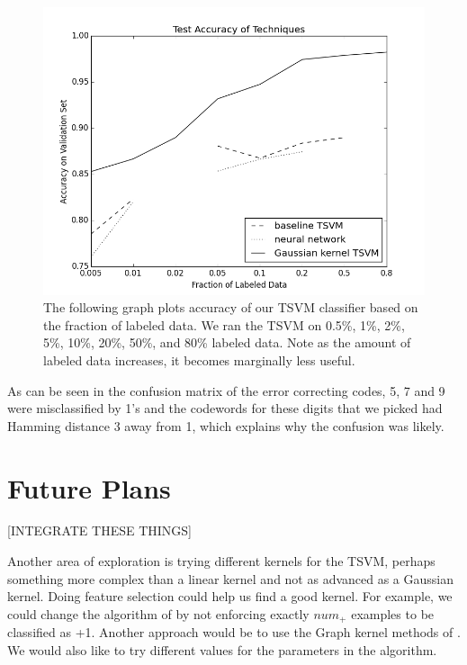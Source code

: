 \documentclass[11pt]{article}
\begin{document}
\begin{figure}
  \centering
  \caption{The following graph plots accuracy of our TSVM classifier based on the fraction of labeled data. We ran the TSVM on 0.5\%, 1\%, 2\%, 5\%, 10\%, 20\%, 50\%, and 80\% labeled data. Note as the amount of labeled data increases, it becomes marginally less useful.}
  \includegraphics[width=5in]{figure_1.png}
\end{figure}


As can be seen in the confusion matrix of the error correcting codes,
5, 7 and 9 were misclassified by 1's and the codewords for
these digits that we picked had Hamming distance 3 away from 1, which
explains why the confusion was likely.

\section{Future Plans}

[INTEGRATE THESE THINGS]

Another area of exploration is trying different kernels for the TSVM, perhaps something more complex than a linear kernel and not as advanced as a Gaussian kernel. Doing feature selection could help us find a good kernel. For example, we could change the algorithm of \cite{Joachims:1999} by not enforcing exactly $num_+$ examples to be classified as +1. Another approach would be to use the Graph kernel methods of \cite{smola2003kernels}. We would also like to try different values for the parameters in the algorithm.
\end{document}
